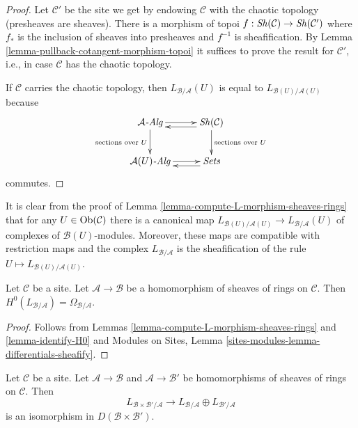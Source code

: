 \begin{proof}
Let $\mathcal{C}'$ be the site we get by endowing $\mathcal{C}$ with the
chaotic topology (presheaves are sheaves). There is a morphism of topoi
$f : \mathop{\mathit{Sh}}\nolimits(\mathcal{C}) \to \mathop{\mathit{Sh}}\nolimits(\mathcal{C}')$ where $f_*$ is the inclusion
of sheaves into presheaves and $f^{-1}$ is sheafification.
By Lemma \ref{lemma-pullback-cotangent-morphism-topoi}
it suffices to prove the result for $\mathcal{C}'$, i.e.,
in case $\mathcal{C}$ has the chaotic topology.

\medskip\noindent
If $\mathcal{C}$ carries the chaotic topology, then
$L_{\mathcal{B}/\mathcal{A}}(U)$ is equal to
$L_{\mathcal{B}(U)/\mathcal{A}(U)}$ because
$$
\xymatrix{
\mathcal{A}\textit{-Alg} \ar[d]_{\text{sections over }U} \ar[r] &
\Sh(\mathcal{C}) \ar@<1ex>[l] \ar[d]^{\text{sections over }U} \\
\mathcal{A}(U)\textit{-Alg} \ar[r] & \textit{Sets} \ar@<1ex>[l]
}
$$
commutes.
\end{proof}

\begin{remark}
\label{remark-map-sections-over-U}
It is clear from the proof of
Lemma \ref{lemma-compute-L-morphism-sheaves-rings}
that for any $U \in \mathop{\mathrm{Ob}}\nolimits(\mathcal{C})$ there is a canonical map
$L_{\mathcal{B}(U)/\mathcal{A}(U)} \to L_{\mathcal{B}/\mathcal{A}}(U)$
of complexes of $\mathcal{B}(U)$-modules. Moreover, these maps
are compatible with restriction maps and the complex
$L_{\mathcal{B}/\mathcal{A}}$
is the sheafification of the rule $U \mapsto L_{\mathcal{B}(U)/\mathcal{A}(U)}$.
\end{remark}

\begin{lemma}
\label{lemma-H0-L-morphism-sheaves-rings}
Let $\mathcal{C}$ be a site. Let $\mathcal{A} \to \mathcal{B}$ be a
homomorphism of sheaves of rings on $\mathcal{C}$. Then
$H^0(L_{\mathcal{B}/\mathcal{A}}) = \Omega_{\mathcal{B}/\mathcal{A}}$.
\end{lemma}

\begin{proof}
Follows from Lemmas \ref{lemma-compute-L-morphism-sheaves-rings}
and \ref{lemma-identify-H0} and
Modules on Sites, Lemma \ref{sites-modules-lemma-differentials-sheafify}.
\end{proof}

\begin{lemma}
\label{lemma-compute-L-product-sheaves-rings}
Let $\mathcal{C}$ be a site. Let $\mathcal{A} \to \mathcal{B}$
and $\mathcal{A} \to \mathcal{B}'$ be homomorphisms of sheaves of rings
on $\mathcal{C}$. Then
$$
L_{\mathcal{B} \times \mathcal{B}'/\mathcal{A}}
\longrightarrow
L_{\mathcal{B}/\mathcal{A}} \oplus L_{\mathcal{B}'/\mathcal{A}}
$$
is an isomorphism in $D(\mathcal{B} \times \mathcal{B}')$.
\end{lemma}

